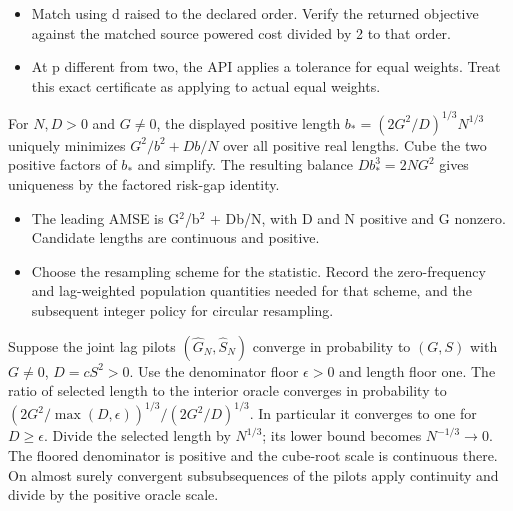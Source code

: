 \expandafter\def\csname statadic@diagnostics@STATADIC-BARYCENTRE-006\endcsname{\begin{itemize}
\item Match using d raised to the declared order. Verify the returned objective against the matched source powered cost divided by 2 to that order.
\item At p different from two, the API applies a tolerance for equal weights. Treat this exact certificate as applying to actual equal weights.
\end{itemize}}
\expandafter\def\csname statadic@statement@STATADIC-BLOCKLENGTH-002\endcsname{For $N,D>0$ and $G\ne 0$, the displayed positive
  length $b_*=(2G^2/D)^{1/3}N^{1/3}$ uniquely minimizes
  $G^2/b^2+Db/N$ over all positive real lengths.}
\expandafter\def\csname statadic@proof@STATADIC-BLOCKLENGTH-002\endcsname{Cube the two positive factors of $b_*$ and simplify.
  The resulting balance $Db_*^3=2NG^2$ gives uniqueness by the
  factored risk-gap identity.}
\expandafter\def\csname statadic@assumptions@STATADIC-BLOCKLENGTH-002\endcsname{\begin{itemize}
\item The leading AMSE is G\ensuremath{{}^2}/b\ensuremath{{}^2} + Db/N, with D and N positive and G nonzero. Candidate lengths are continuous and positive.
\end{itemize}}
\expandafter\def\csname statadic@diagnostics@STATADIC-BLOCKLENGTH-002\endcsname{\begin{itemize}
\item Choose the resampling scheme for the statistic. Record the zero-frequency and lag-weighted population quantities needed for that scheme, and the subsequent integer policy for circular resampling.
\end{itemize}}
\expandafter\def\csname statadic@statement@STATADIC-BLOCKLENGTH-003\endcsname{Suppose the joint lag pilots $(\hat G_N,\hat S_N)$
  converge in probability to $(G,S)$ with $G\ne0$, $D=cS^2>0$.
  Use the denominator floor $\epsilon>0$ and length floor one. The ratio
  of selected length to the interior oracle converges in probability
  to $(2G^2/\max(D,\epsilon))^{1/3}/(2G^2/D)^{1/3}$. In particular it
  converges to one for $D\ge\epsilon$.}
\expandafter\def\csname statadic@proof@STATADIC-BLOCKLENGTH-003\endcsname{Divide the selected length by $N^{1/3}$; its lower
  bound becomes $N^{-1/3}\to0$. The floored denominator is positive
  and the cube-root scale is continuous there. On almost surely
  convergent subsubsequences of the pilots apply continuity and divide
  by the positive oracle scale.}
